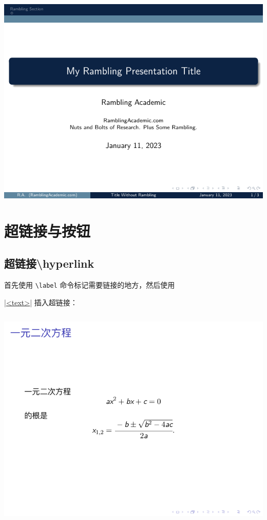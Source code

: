 \begin{column}{0.5\textwidth}
\includegraphics[page=2]{examples/beamer/beamercolor02.pdf}

\section{超链接与按钮}

\subsection{超链接{\ttfamily \textbackslash hyperlink}}

首先使用 \verb|\label| 命令标记需要链接的地方，然后使用

|\hyperlink{<label>}{<text>}|
插入超链接：

\inputminted[linenos=true]{latex}{examples/beamer/beamerhyperlink01.tex}

\includegraphics[page=1]{examples/beamer/beamerhyperlink01.pdf}


\end{column}
